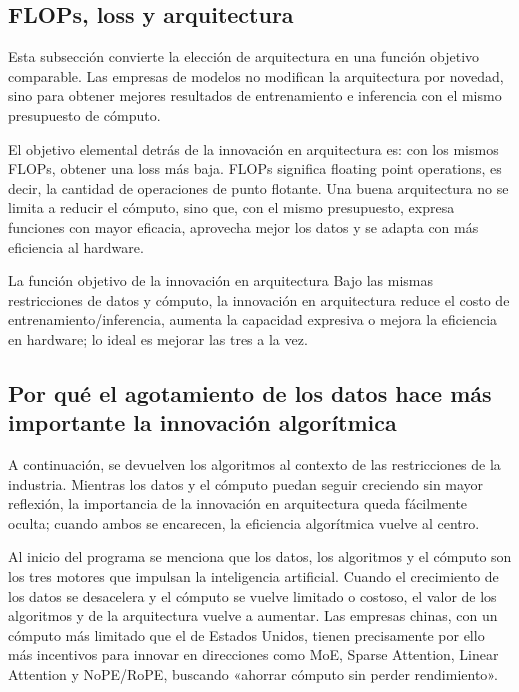 \documentclass[a4paper]{article}
\begin{document}
\subsection{FLOPs, loss y arquitectura}

Esta subsección convierte la elección de arquitectura en una función objetivo comparable. Las empresas de modelos no modifican la arquitectura por novedad, sino para obtener mejores resultados de entrenamiento e inferencia con el mismo presupuesto de cómputo.

El objetivo elemental detrás de la innovación en arquitectura es: con los mismos FLOPs, obtener una loss más baja. FLOPs significa floating point operations, es decir, la cantidad de operaciones de punto flotante. Una buena arquitectura no se limita a reducir el cómputo, sino que, con el mismo presupuesto, expresa funciones con mayor eficacia, aprovecha mejor los datos y se adapta con más eficiencia al hardware.

\begin{importantbox}{La función objetivo de la innovación en arquitectura}
Bajo las mismas restricciones de datos y cómputo, la innovación en arquitectura reduce el costo de entrenamiento/inferencia, aumenta la capacidad expresiva o mejora la eficiencia en hardware; lo ideal es mejorar las tres a la vez.
\end{importantbox}

\subsection{Por qué el agotamiento de los datos hace más importante la innovación algorítmica}

A continuación, se devuelven los algoritmos al contexto de las restricciones de la industria. Mientras los datos y el cómputo puedan seguir creciendo sin mayor reflexión, la importancia de la innovación en arquitectura queda fácilmente oculta; cuando ambos se encarecen, la eficiencia algorítmica vuelve al centro.

Al inicio del programa se menciona que los datos, los algoritmos y el cómputo son los tres motores que impulsan la inteligencia artificial. Cuando el crecimiento de los datos se desacelera y el cómputo se vuelve limitado o costoso, el valor de los algoritmos y de la arquitectura vuelve a aumentar. Las empresas chinas, con un cómputo más limitado que el de Estados Unidos, tienen precisamente por ello más incentivos para innovar en direcciones como MoE, Sparse Attention, Linear Attention y NoPE/RoPE, buscando «ahorrar cómputo sin perder rendimiento».
\end{document}
